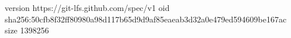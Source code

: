 version https://git-lfs.github.com/spec/v1
oid sha256:50cfb8f32ff80980a98d117b65d9d9af85eaeab3d32a0e479ed594609be167ac
size 1398256
